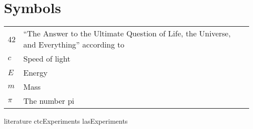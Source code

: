 \documentclass[master=ewit,english]{kulemt}
\begin{document}
\section*{Symbols}
\begin{flushleft}
  \renewcommand{\arraystretch}{1.1}
  \begin{tabularx}{\textwidth}{@{}p{12mm}X@{}}
    42    & ``The Answer to the Ultimate Question of Life, the Universe,
            and Everything'' according to \cite{h2g2} \\
    $c$   & Speed of light \\
    $E$   & Energy \\
    $m$   & Mass \\
    $\pi$ & The number pi \\
  \end{tabularx}
\end{flushleft}

\mainmatter

{literature}
{ctcExperiments}
{lasExperiments}

%
%

\backmatter


\end{document}
